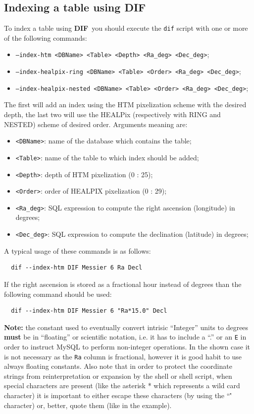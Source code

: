 \documentclass[10pt,titlepage]{article}
\newcommand{\dif}{\textbf{\small DIF}}
\begin{document}
\subsection{Indexing a table using \dif}
To index a table using \dif\ you should execute the {\tt dif} script
with one or more of the following commands:
%
\begin{itemize}
\item {\tt --index-htm <DBName> <Table> <Depth> <Ra\_deg> <Dec\_deg>};
\item {\tt --index-healpix-ring  <DBName> <Table> <Order> <Ra\_deg> <Dec\_deg>};
\item {\tt --index-healpix-nested  <DBName> <Table> <Order> <Ra\_deg> <Dec\_deg>};
%
\end{itemize}
The first will add an index using the HTM pixelization scheme with the
desired depth, the last two will use the HEALPix (respectively with
RING and NESTED) scheme of desired order. Arguments meaning are:
%
\begin{itemize}
\item {\tt <DBName>}: name of the database which contains the table;
\item {\tt <Table>}: name of the table to which index should be added;
\item {\tt <Depth>}: depth of HTM pixelization (0 : 25);
\item {\tt <Order>}: order of HEALPIX pixelization (0 : 29);
\item {\tt <Ra\_deg>}:  SQL expression to compute the right ascension
 (longitude) in degrees;
\item {\tt <Dec\_deg>}: SQL expression to compute the declination
 (latitude) in degrees;
\end{itemize}
%
A typical usage of these commands is as follows:
\begin{verbatim}
  dif --index-htm DIF Messier 6 Ra Decl
\end{verbatim}
If the right ascension is stored as a fractional hour instead of
degrees than the following command should be used:
\begin{verbatim}
  dif --index-htm DIF Messier 6 "Ra*15.0" Decl
\end{verbatim}
%
\textbf{Note:} the constant used to eventually convert intrisic ``Integer'' units
to degrees {\bf must} be in ``floating'' or scientific notation,
i.e. it has to include a ``.'' or an {\tt E} in order to instruct MySQL
to perform non-integer operations. In the shown case it is not
necessary as the {\tt Ra} column is fractional, however it is good habit to
use always floating constants. Also note that in order to protect the
coordinate strings from reinterpretation or expansion by the shell or shell
script, when special characters are present (like the asterisk * which
represents a wild card character) it is important to either escape these
characters (by using the ``\'' character) or, better, quote them
(like in the example).
\end{document}
